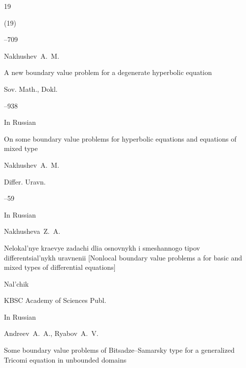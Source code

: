 \begin{thebibliography}{19}

(19)

--709





\by Nakhushev~A.~M.

\paper A new boundary value problem for a degenerate hyperbolic equation

\jour Sov. Math., Dokl. 



--938 






\lang In Russian

\paper On some boundary value problems for hyperbolic equations and equations of mixed type

\by Nakhushev~A.~M.

\jour Differ. Uravn.




–59





\lang In Russian

\by Nakhusheva~Z.~A.

\book Nelokal'nye kraevye zadachi dlia osnovnykh i smeshannogo tipov differentsial'nykh uravnenii \rm [Nonlocal boundary value problems a for basic and mixed types of differential equations]

\publaddr Nal'chik

\publ KBSC Academy of Sciences Publ.








\lang In Russian

\by Andreev~A.~A., Ryabov~A.~V.

\paper Some boundary value problems of Bitsadze--Samarsky type for a generalized Tricomi equation in  unbounded domains


\end{thebibliography}
